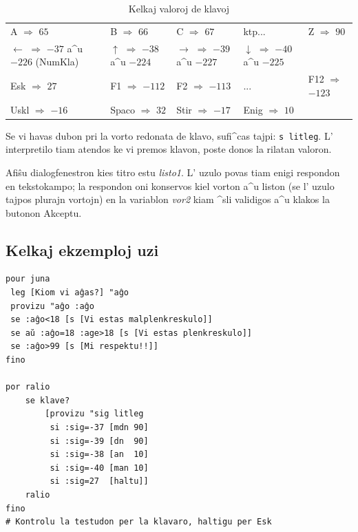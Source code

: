 \begin{table}[h]
\begin{tabular}{|lllll|}
\hline
A $\Longrightarrow$ $65$ & B $\Longrightarrow$ $66$ & C $\Longrightarrow$ $67$ & ktp... & Z $\Longrightarrow$ $90$\\
\parbox{3cm}{\flushleft $\leftarrow$ $\Longrightarrow$ $-37$ a^u $-226$ (NumKla)} & 
\parbox{3cm}{\flushleft $\uparrow$ $\Longrightarrow$ $-38$ a^u $-224$} &
\parbox{3cm}{\flushleft $\rightarrow$ $\Longrightarrow$ $-39$ a^u $-227$}  & 
\parbox{3cm}{\flushleft $\downarrow$ $\Longrightarrow$ $-40$ a^u $-225$} &\\
Esk $\Longrightarrow$ $27$ & F1 $\Longrightarrow$ $-112$ & F2 $\Longrightarrow$ $-113$ & ... & F12 $\Longrightarrow$ $-123$\\
Uskl $\Longrightarrow$ $-16$ & Spaco $\Longrightarrow$ $32$ & Stir $\Longrightarrow$ $-17$ & Enig $\Longrightarrow$ $10$ &\\
\hline
\end{tabular}
\caption{Kelkaj valoroj de klavoj}
\end{table}

Se vi havas dubon pri la vorto redonata de klavo, sufi^cas tajpi:
\texttt{s litleg}.  L' interpretilo tiam atendos ke vi premos klavon,
poste donos la rilatan valoron.


Afiŝu dialogfenestron kies titro estu \textit{listo1}.  L' uzulo povas
tiam enigi respondon en tekstokampo; la respondon oni konservos kiel
vorton a^u liston (se l' uzulo tajpos plurajn vortojn) en la variablon
\textit{vor2} kiam ^sli validigos a^u klakos la butonon Akceptu.

\subsection{Kelkaj ekzemploj uzi}

\begin{verbatim}
pour juna
 leg [Kiom vi aĝas?] "aĝo
 provizu "aĝo :aĝo
 se :aĝo<18 [s [Vi estas malplenkreskulo]]
 se aŭ :aĝo=18 :age>18 [s [Vi estas plenkreskulo]]
 se :aĝo>99 [s [Mi respektu!!]]
fino

por ralio
    se klave? 
        [provizu "sig litleg
         si :sig=-37 [mdn 90]
         si :sig=-39 [dn  90]
         si :sig=-38 [an  10]
         si :sig=-40 [man 10]
         si :sig=27  [haltu]]
    ralio
fino
# Kontrolu la testudon per la klavaro, haltigu per Esk
\end{verbatim}

